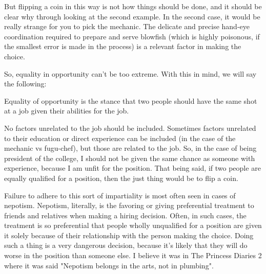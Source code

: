 
But flipping a coin in this way is not how things should be done, and it should be clear why through looking at the second example. In the second case, it would be really strange for you to pick the mechanic. The delicate and precise hand-eye coordination required to prepare and serve blowfish (which is highly poisonous, if the smallest error is made in the process) is a relevant factor in making the choice. 

So, equality in opportunity can't be too extreme. With this in mind, we will say the following:
\begin{center}
Equality of opportunity is the stance that two people should have the same shot at a job given their abilities for the job.
\end{center}
No factors unrelated to the job should be included. Sometimes factors unrelated to their education or direct experience can be included (in the case of the mechanic vs fugu-chef), but those are related to the job. So, in the case of being president of the college, I should not be given the same chance as someone with experience, because I am unfit for the position. That being said, if two people are equally qualified for a position, then the just thing would be to flip a coin.

Failure to adhere to this sort of impartiality is most often seen in cases of nepotism. Nepotism, literally, is the favoring or giving preferential treatment to friends and relatives when making a hiring decision. Often, in such cases, the treatment is so preferential that people wholly unqualified for a position are given it solely because of their relationship with the person making the choice.  Doing such a thing is a very dangerous decision, because it's likely that they will do worse in the position than someone else. I believe it was in The Princess Diaries 2 where it was said "Nepotism belongs in the arts, not in plumbing". 

